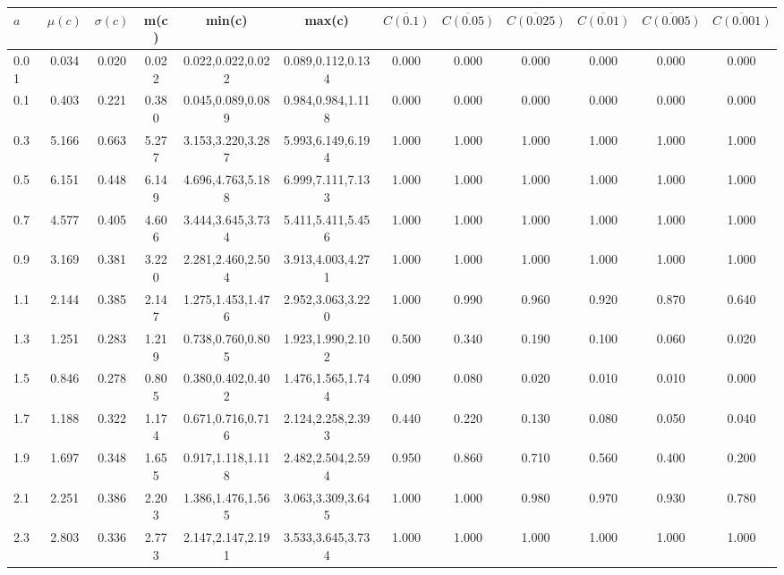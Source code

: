 \begin{table*}[h!]
\begin{center}
\begin{tabular}{| l | c | c | c | c | c | c | c | c | c | c | c |}\hline
$a$ & $\mu(c)$ & $\sigma(c)$ & m(c) & min(c) & max(c) & $\overline{C(0.1)}$ & $\overline{C(0.05)}$ & $\overline{C(0.025)}$ & $\overline{C(0.01)}$ & $\overline{C(0.005)}$ & $\overline{C(0.001)}$ \\\hline
0.01 & 0.034 & 0.020 & 0.022 & 0.022,0.022,0.022 & 0.089,0.112,0.134  & 0.000  & 0.000  & 0.000  & 0.000  & 0.000  & 0.000 \\\hline
0.1 & 0.403 & 0.221 & 0.380 & 0.045,0.089,0.089 & 0.984,0.984,1.118  & 0.000  & 0.000  & 0.000  & 0.000  & 0.000  & 0.000 \\\hline
0.3 & 5.166 & 0.663 & 5.277 & 3.153,3.220,3.287 & 5.993,6.149,6.194  & 1.000  & 1.000  & 1.000  & 1.000  & 1.000  & 1.000 \\\hline
0.5 & 6.151 & 0.448 & 6.149 & 4.696,4.763,5.188 & 6.999,7.111,7.133  & 1.000  & 1.000  & 1.000  & 1.000  & 1.000  & 1.000 \\\hline
0.7 & 4.577 & 0.405 & 4.606 & 3.444,3.645,3.734 & 5.411,5.411,5.456  & 1.000  & 1.000  & 1.000  & 1.000  & 1.000  & 1.000 \\\hline
0.9 & 3.169 & 0.381 & 3.220 & 2.281,2.460,2.504 & 3.913,4.003,4.271  & 1.000  & 1.000  & 1.000  & 1.000  & 1.000  & 1.000 \\\hline
1.1 & 2.144 & 0.385 & 2.147 & 1.275,1.453,1.476 & 2.952,3.063,3.220  & 1.000  & 0.990  & 0.960  & 0.920  & 0.870  & 0.640 \\\hline
1.3 & 1.251 & 0.283 & 1.219 & 0.738,0.760,0.805 & 1.923,1.990,2.102  & 0.500  & 0.340  & 0.190  & 0.100  & 0.060  & 0.020 \\\hline
1.5 & 0.846 & 0.278 & 0.805 & 0.380,0.402,0.402 & 1.476,1.565,1.744  & 0.090  & 0.080  & 0.020  & 0.010  & 0.010  & 0.000 \\\hline
1.7 & 1.188 & 0.322 & 1.174 & 0.671,0.716,0.716 & 2.124,2.258,2.393  & 0.440  & 0.220  & 0.130  & 0.080  & 0.050  & 0.040 \\\hline
1.9 & 1.697 & 0.348 & 1.655 & 0.917,1.118,1.118 & 2.482,2.504,2.594  & 0.950  & 0.860  & 0.710  & 0.560  & 0.400  & 0.200 \\\hline
2.1 & 2.251 & 0.386 & 2.203 & 1.386,1.476,1.565 & 3.063,3.309,3.645  & 1.000  & 1.000  & 0.980  & 0.970  & 0.930  & 0.780 \\\hline
2.3 & 2.803 & 0.336 & 2.773 & 2.147,2.147,2.191 & 3.533,3.645,3.734  & 1.000  & 1.000  & 1.000  & 1.000  & 1.000  & 1.000 \\\hline

\end{tabular}
\end{center}
\end{table*}

